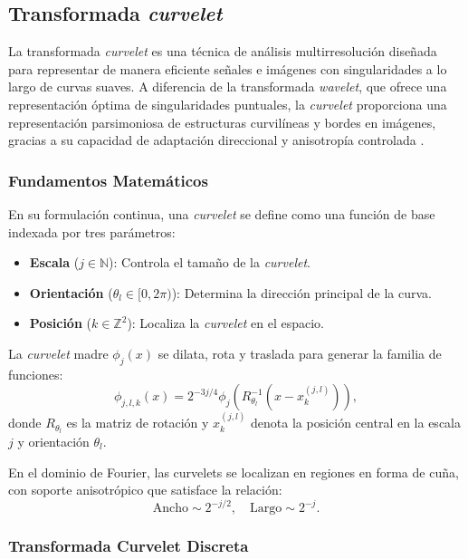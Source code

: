 \subsection{Transformada \textit{curvelet}}

La transformada \textit{curvelet} es una técnica de análisis multirresolución diseñada para representar de manera eficiente señales e imágenes con singularidades a lo largo de curvas suaves. A diferencia de la transformada \textit{wavelet}, que ofrece una representación óptima de singularidades puntuales, la \textit{curvelet} proporciona una representación parsimoniosa de estructuras curvilíneas y bordes en imágenes, gracias a su capacidad de adaptación direccional y anisotropía controlada \cite{Curvelets2000,FastCurveletTransform}.

\subsubsection{Fundamentos Matemáticos}

En su formulación continua, una \textit{curvelet} se define como una función de base indexada por tres parámetros: 
\begin{itemize}
    \item \textbf{Escala} (\(j \in \mathbb{N}\)): Controla el tamaño de la \textit{curvelet}.
    \item \textbf{Orientación} (\(\theta_l \in [0, 2\pi)\)): Determina la dirección principal de la curva.
    \item \textbf{Posición} (\(k \in \mathbb{Z}^2\)): Localiza la \textit{curvelet} en el espacio.
\end{itemize}

La \textit{curvelet} madre \(\phi_j(x)\) se dilata, rota y traslada para generar la familia de funciones:
\[
\phi_{j,l,k}(x) = 2^{-3j/4} \phi_j \left( R_{\theta_l}^{-1}(x - x_k^{(j,l)}) \right),
\]
donde \(R_{\theta_l}\) es la matriz de rotación y \(x_k^{(j,l)}\) denota la posición central en la escala \(j\) y orientación \(\theta_l\).

En el dominio de Fourier, las curvelets se localizan en regiones en forma de cuña, con soporte anisotrópico que satisface la relación:
\[
\text{Ancho} \sim 2^{-j/2}, \quad \text{Largo} \sim 2^{-j}.
\]

\subsubsection{Transformada Curvelet Discreta}

